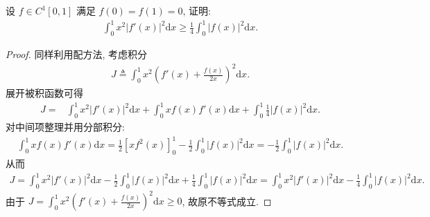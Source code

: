 \documentclass[../../main.tex]{subfiles}%
\begin{document}
\begin{example}
设 \(f \in C^1[0,1]\) 满足 \(f(0) = f(1) = 0\), 证明:
\begin{align*}
\int_0^1 x^2 |f'(x)|^2 \mathrm{d}x \geqslant \frac{1}{4} \int_0^1 |f(x)|^2 \mathrm{d}x.
\end{align*}
\end{example}
\begin{proof}
同样利用配方法, 考虑积分
\begin{align*}
J \triangleq \int_0^1 x^2 \left( f'(x) + \frac{f(x)}{2x} \right)^2 \mathrm{d}x.
\end{align*}
展开被积函数可得
\begin{align*}
J = {} & \int_0^1 x^2 |f'(x)|^2 \mathrm{d}x + \int_0^1 x f(x) f'(x) \mathrm{d}x + \int_0^1 \frac{1}{4} |f(x)|^2 \mathrm{d}x.
\end{align*}
对中间项整理并用分部积分:
\begin{align*}
\int_0^1 x f(x) f'(x) \mathrm{d}x  = \frac{1}{2} \left[ x f^2(x) \right]_0^1 - \frac{1}{2} \int_0^1 |f(x)|^2 \mathrm{d}x=- \frac{1}{2} \int_0^1 |f(x)|^2 \mathrm{d}x.
\end{align*}
从而
\begin{align*}
J = {}  \int_0^1 x^2 |f'(x)|^2 \mathrm{d}x - \frac{1}{2} \int_0^1 |f(x)|^2 \mathrm{d}x + \frac{1}{4} \int_0^1 |f(x)|^2 \mathrm{d}x 
= \int_0^1 x^2 |f'(x)|^2 \mathrm{d}x - \frac{1}{4} \int_0^1 |f(x)|^2 \mathrm{d}x.
\end{align*}
由于 \(J = \int_0^1 x^2 \left( f'(x) + \frac{f(x)}{2x} \right)^2 \mathrm{d}x \geqslant 0\), 故原不等式成立.
\end{proof}
\end{document}
